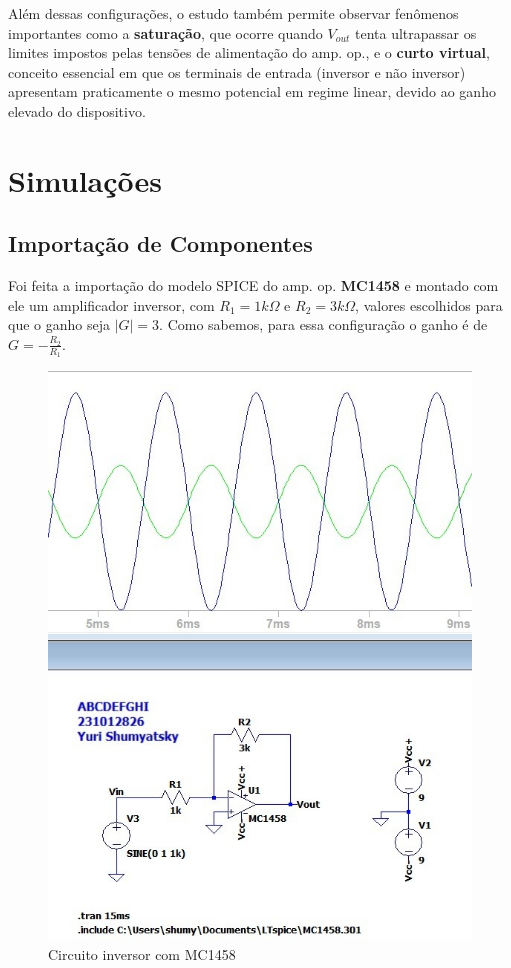 \documentclass[10pt,twocolumn,letterpaper]{article}
\begin{document}
Além dessas configurações, o estudo também permite observar fenômenos importantes como a \textbf{saturação}, que ocorre quando $V_{out}$ tenta ultrapassar os limites impostos pelas tensões de alimentação do amp. op., e o \textbf{curto virtual}, conceito essencial em que os terminais de entrada (inversor e não inversor) apresentam praticamente o mesmo potencial em regime linear, devido ao ganho elevado do dispositivo.





\section{Simulações}

\subsection{Importação de Componentes}
Foi feita a importação do modelo SPICE do amp. op. \textbf{MC1458} e montado com ele um amplificador inversor, com $R_1 = 1k\Omega$ e $R_2 = 3k\Omega$, valores escolhidos para que o ganho seja $|G|=3$. Como sabemos, para essa configuração o ganho é de $G = -\frac{R_2}{R_1}$. 

\begin{figure}[h]
\caption{Circuito inversor com MC1458}
\begin{center}
\includegraphics[scale=0.27]{figuras/fig1}
\end{center}
\end{figure}
\end{document}
